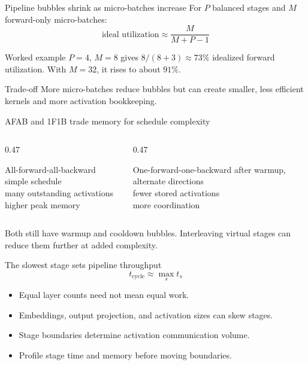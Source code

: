 \documentclass[handout]{beamer}
\begin{document}
\begin{frame}{Pipeline bubbles shrink as micro-batches increase}
  For $P$ balanced stages and $M$ forward-only micro-batches:
  \[
    \text{ideal utilization}\approx\frac{M}{M+P-1}
  \]
  \begin{block}{Worked example}
    $P=4$, $M=8$ gives $8/(8+3)\approx73\%$ idealized forward utilization. With $M=32$, it rises to about $91\%$.
  \end{block}
  \begin{alertblock}{Trade-off}
    More micro-batches reduce bubbles but can create smaller, less efficient kernels and more activation bookkeeping.
  \end{alertblock}
\end{frame}

\begin{frame}{AFAB and 1F1B trade memory for schedule complexity}
  \begin{columns}[t]
    \begin{column}{0.47\linewidth}
      \begin{block}{All-forward-all-backward}
        simple schedule\\many outstanding activations\\higher peak memory
      \end{block}
    \end{column}
    \begin{column}{0.47\linewidth}
      \begin{block}{One-forward-one-backward}
        after warmup, alternate directions\\fewer stored activations\\more coordination
      \end{block}
    \end{column}
  \end{columns}
  \vfill
  Both still have warmup and cooldown bubbles. Interleaving virtual stages can reduce them further at added complexity.
\end{frame}

\begin{frame}{The slowest stage sets pipeline throughput}
  \[
    t_{\text{cycle}}\approx\max_s t_s
  \]
  \begin{itemize}
    \setlength{\itemsep}{7pt}
    \item Equal layer counts need not mean equal work.
    \item Embeddings, output projection, and activation sizes can skew stages.
    \item Stage boundaries determine activation communication volume.
    \item Profile stage time and memory before moving boundaries.
  \end{itemize}
\end{frame}
\end{document}
